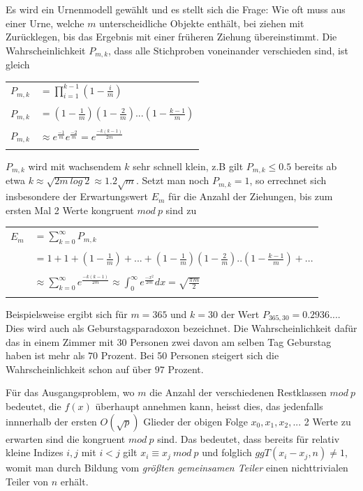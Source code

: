 \documentclass[10pt, bigheadings]{scrartcl}
\begin{document}
Es wird ein Urnenmodell gewählt und es stellt sich die Frage: Wie oft
muss aus einer Urne, welche $m$ unterscheidliche Objekte enthält, bei ziehen
mit Zurücklegen, bis das Ergebnis mit einer früheren Ziehung übereinstimmt.
Die Wahrscheinlichkeit $P_{m,k}$, dass alle Stichproben voneinander
verschieden sind, ist gleich
\begin{center}
\begin{tabular}{ll}
$P_{m,k}$ & $ = \prod_{i=1}^{k-1}(1- \frac{i}{m})$\\\\
$P_{m,k}$ & $= (1-\frac{1}{m})(1-\frac{2}{m})...(1-\frac{k-1}{m})$\\\\
$P_{m,k}$ & $\approx e^{\frac{-1}{m}} e^{\frac{-2}{m}} = e^{\frac{-k(k-1)}{2m}}$\\\\
\end{tabular}
\end{center}
$P_{m,k}$ wird mit wachsendem $k$ sehr schnell klein, z.B gilt $P_{m,k}\leq0.5$
bereits ab etwa $k\approx\sqrt{2m\ log\ 2}\approx1.2\sqrt{m}$. Setzt man noch
$P_{m,k} = 1$, so errechnet sich insbesondere der Erwartungswert $E_m$ für die
Anzahl der Ziehungen, bis zum ersten Mal 2 Werte kongruent $mod\ p$ sind zu\\
\begin{center}
\begin{tabular}{ll}
$E_m$ & $= \sum_{k=0}^\infty P_{m,k}$\\\\
	& $= 1+1+(1-\frac{1}{m})+...+(1-\frac{1}{m})(1-\frac{2}{m})..(1-\frac{k-1}{m})+...$\\\\
	& $\approx \sum_{k=0}^\infty e^{\frac{-k(k-1)}{2m}}
	 \approx \int_0^\infty e^{\frac{-x^2}{2m}}dx = \sqrt{\frac{\pi m}{2}}$\\\\
\end{tabular}
\end{center}

Beispielsweise ergibt sich für $m=365$ und $k=30$ der Wert $P_{365,30} = 0.2936...$.
Dies wird auch als Geburstagsparadoxon bezeichnet. Die Wahrscheinlichkeit dafür
das in einem Zimmer mit 30 Personen zwei davon am selben Tag Geburstag haben ist
mehr als $70$ Prozent. Bei 50 Personen steigert sich die Wahrscheinlichkeit schon
auf über $97$ Prozent.

Für das Ausgangsproblem, wo $m$ die Anzahl der verschiedenen Restklassen $mod\ p$
bedeutet, die $f(x)$ überhaupt annehmen kann, heisst dies, das jedenfalls innnerhalb
der ersten $O(\sqrt{p})$ Glieder der obigen Folge $x_0, x_1, x_2,...$ 2 Werte
zu erwarten sind die kongruent $mod\ p$ sind. Das bedeutet, dass bereits für relativ
kleine Indizes $i,j$ mit $i<j$ gilt $x_i \equiv x_j\ mod\ p$ und folglich
$ggT(x_i-x_j,n) \neq 1$, womit man durch Bildung vom \textit{größten gemeinsamen Teiler}
 einen nichttrivialen Teiler von $n$ erhält.
\end{document}
